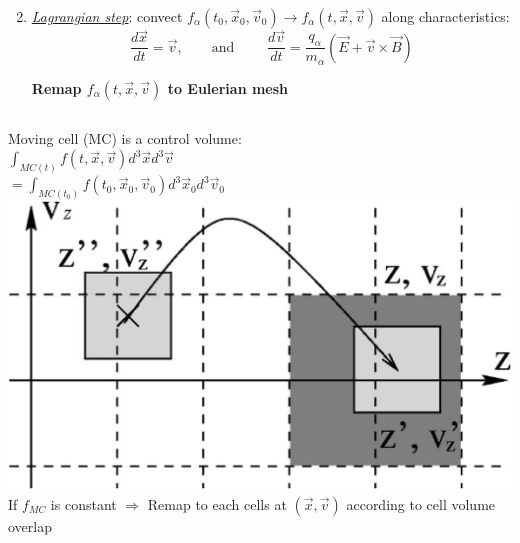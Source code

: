 \documentclass{beamer}
\begin{document}
\begin{frame}{\subsecname}
  
\begin{enumerate}
  \setcounter{enumi}{1}
 
\item \emph{\underline{Lagrangian step}}: convect $f_{\alpha}(t_0,\vec{x}_0,\vec{v}_0) \rightarrow f_{\alpha}(t,\vec{x},\vec{v})$ along characteristics:
$$\frac{d\vec{x}}{dt} = \vec{v}, \qquad \text{and } \qquad \frac{d\vec{v}}{dt} =  \frac{q_{\alpha}}{m_{\alpha}}\left( \vec{E} + \vec{v} \times \vec{B}\right)$$

\textbf{Remap $f_{\alpha}(t, \vec{x}, \vec{v})$ to Eulerian mesh}
\end{enumerate} \vspace{0.4em} 

\begin{columns}
Moving cell (MC) is a control volume:\\[1em]
  
$\int_{MC(t)} f(t,\vec{x},\vec{v})d^3\vec{x}d^3\vec{v}$ \\[1em]  $= \int_{MC(t_0)} f(t_0,\vec{x}_0,\vec{v}_0)d^3\vec{x}_0d^3\vec{v}_0$
\includegraphics[scale=0.18]{graphics/remap_rule}\\
If $f_{MC}$ is constant $\Rightarrow$ Remap to each cells at $(\vec{x},\vec{v})$ according to cell volume overlap
\end{columns}


\end{frame}

\end{document}
